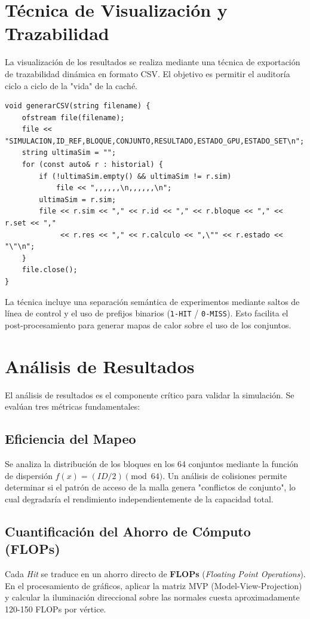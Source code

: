 \documentclass[12pt,a4paper]{article}
\begin{document}
\section{Técnica de Visualización y Trazabilidad}
La visualización de los resultados se realiza mediante una técnica de exportación de trazabilidad dinámica en formato CSV. El objetivo es permitir el auditoría ciclo a ciclo de la "vida" de la caché. 

\begin{lstlisting}
void generarCSV(string filename) {
    ofstream file(filename);
    file << "SIMULACION,ID_REF,BLOQUE,CONJUNTO,RESULTADO,ESTADO_GPU,ESTADO_SET\n";
    string ultimaSim = "";
    for (const auto& r : historial) {
        if (!ultimaSim.empty() && ultimaSim != r.sim) 
            file << ",,,,,,\n,,,,,,\n";
        ultimaSim = r.sim;
        file << r.sim << "," << r.id << "," << r.bloque << "," << r.set << "," 
             << r.res << "," << r.calculo << ",\"" << r.estado << "\"\n";
    }
    file.close();
}
\end{lstlisting}

La técnica incluye una separación semántica de experimentos mediante saltos de línea de control y el uso de prefijos binarios (\texttt{1-HIT} / \texttt{0-MISS}). Esto facilita el post-procesamiento para generar mapas de calor sobre el uso de los conjuntos.

\section{Análisis de Resultados}
El análisis de resultados es el componente crítico para validar la simulación. Se evalúan tres métricas fundamentales:

\subsection{Eficiencia del Mapeo}
Se analiza la distribución de los bloques en los 64 conjuntos mediante la función de dispersión $f(x) = (ID/2) \pmod{64}$. Un análisis de colisiones permite determinar si el patrón de acceso de la malla genera "conflictos de conjunto", lo cual degradaría el rendimiento independientemente de la capacidad total.

\subsection{Cuantificación del Ahorro de Cómputo (FLOPs)}
Cada \textit{Hit} se traduce en un ahorro directo de \textbf{FLOPs} (\textit{Floating Point Operations}). En el procesamiento de gráficos, aplicar la matriz MVP (Model-View-Projection) y calcular la iluminación direccional sobre las normales cuesta aproximadamente 120-150 FLOPs por vértice.
\end{document}
